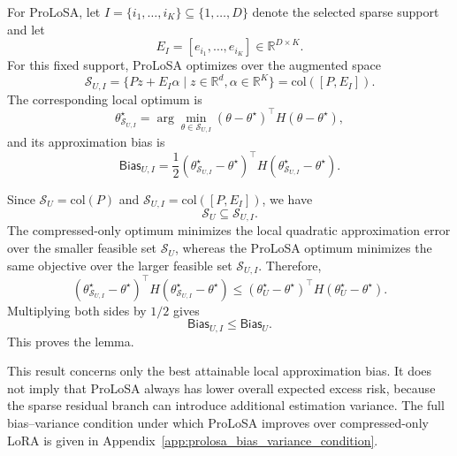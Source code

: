 For ProLoSA, let $I=\{i_1,\ldots,i_K\}\subseteq\{1,\ldots,D\}$ denote the selected sparse support and let
\begin{equation}
E_I=[e_{i_1},\ldots,e_{i_K}]\in\mathbb{R}^{D\times K}.
\label{eq:app_coordinate_selection_matrix}
\end{equation}
For this fixed support, ProLoSA optimizes over the augmented space
\begin{equation}
\mathcal{S}_{U,I}
=
\{Pz+E_I\alpha\mid z\in\mathbb{R}^d,\alpha\in\mathbb{R}^K\}
=
\mathrm{col}([P,E_I]).
\label{eq:app_augmented_space}
\end{equation}
The corresponding local optimum is
\begin{equation}
\theta^\star_{\mathcal{S}_{U,I}}
=
\arg\min_{\theta\in\mathcal{S}_{U,I}}
(\theta-\theta^\star)^\top
H
(\theta-\theta^\star),
\label{eq:app_prolosa_local_optimum}
\end{equation}
and its approximation bias is
\begin{equation}
\mathsf{Bias}_{U,I}
=
\frac{1}{2}
(\theta^\star_{\mathcal{S}_{U,I}}-\theta^\star)^\top
H
(\theta^\star_{\mathcal{S}_{U,I}}-\theta^\star).
\label{eq:app_prolosa_bias}
\end{equation}

Since $\mathcal{S}_U=\mathrm{col}(P)$ and $\mathcal{S}_{U,I}=\mathrm{col}([P,E_I])$, we have
\begin{equation}
\mathcal{S}_U\subseteq\mathcal{S}_{U,I}.
\label{eq:app_space_inclusion}
\end{equation}
The compressed-only optimum minimizes the local quadratic approximation error over the smaller feasible set $\mathcal{S}_U$, whereas the ProLoSA optimum minimizes the same objective over the larger feasible set $\mathcal{S}_{U,I}$.
Therefore,
\begin{equation}
(\theta^\star_{\mathcal{S}_{U,I}}-\theta^\star)^\top
H
(\theta^\star_{\mathcal{S}_{U,I}}-\theta^\star)
\le
(\theta^\star_U-\theta^\star)^\top
H
(\theta^\star_U-\theta^\star).
\label{eq:app_bias_monotonicity_quadratic}
\end{equation}
Multiplying both sides by $1/2$ gives
\begin{equation}
\mathsf{Bias}_{U,I}
\le
\mathsf{Bias}_{U}.
\label{eq:app_bias_monotonicity}
\end{equation}
This proves the lemma.

This result concerns only the best attainable local approximation bias.
It does not imply that ProLoSA always has lower overall expected excess risk, because the sparse residual branch can introduce additional estimation variance.
The full bias--variance condition under which ProLoSA improves over compressed-only LoRA is given in Appendix~\ref{app:prolosa_bias_variance_condition}.

